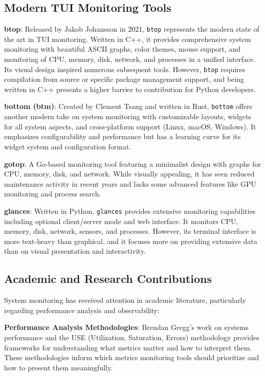 \documentclass[12pt,a4paper,oneside]{report}
\begin{document}
\subsection{Modern TUI Monitoring Tools}

\textbf{btop}: Released by Jakob Johansson in 2021, \texttt{btop} represents the modern state of the art in TUI monitoring. Written in C++, it provides comprehensive system monitoring with beautiful ASCII graphs, color themes, mouse support, and monitoring of CPU, memory, disk, network, and processes in a unified interface. Its visual design inspired numerous subsequent tools. However, \texttt{btop} requires compilation from source or specific package management support, and being written in C++ presents a higher barrier to contribution for Python developers.

\textbf{bottom (btm)}: Created by Clement Tsang and written in Rust, \texttt{bottom} offers another modern take on system monitoring with customizable layouts, widgets for all system aspects, and cross-platform support (Linux, macOS, Windows). It emphasizes configurability and performance but has a learning curve for its widget system and configuration format.

\textbf{gotop}: A Go-based monitoring tool featuring a minimalist design with graphs for CPU, memory, disk, and network. While visually appealing, it has seen reduced maintenance activity in recent years and lacks some advanced features like GPU monitoring and process search.

\textbf{glances}: Written in Python, \texttt{glances} provides extensive monitoring capabilities including optional client/server mode and web interface. It monitors CPU, memory, disk, network, sensors, and processes. However, its terminal interface is more text-heavy than graphical, and it focuses more on providing extensive data than on visual presentation and interactivity.

\subsection{Academic and Research Contributions}

System monitoring has received attention in academic literature, particularly regarding performance analysis and observability:

\textbf{Performance Analysis Methodologies}: Brendan Gregg's work on systems performance and the USE (Utilization, Saturation, Errors) methodology provides frameworks for understanding what metrics matter and how to interpret them. These methodologies inform which metrics monitoring tools should prioritize and how to present them meaningfully.
\end{document}
